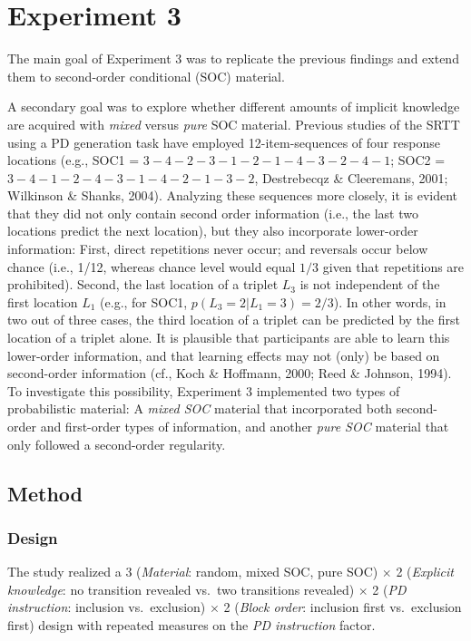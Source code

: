 \documentclass[floatsintext,doc]{apa6}
\theoremstyle{definition}
\theoremstyle{definition}
\theoremstyle{definition}
\theoremstyle{remark}
\begin{document}
\section{Experiment 3}\label{experiment-3}

The main goal of Experiment 3 was to replicate the previous findings and
extend them to second-order conditional (SOC) material.

A secondary goal was to explore whether different amounts of implicit
knowledge are acquired with \emph{mixed} versus \emph{pure} SOC
material. Previous studies of the SRTT using a PD generation task have
employed 12-item-sequences of four response locations (e.g., SOC1 =
\(3{-}4{-}2{-}3{-}1{-}2{-}1{-}4{-}3{-}2{-}4{-}1\); SOC2 =
\(3{-}4{-}1{-}2{-}4{-}3{-}1{-}4{-}2{-}1{-}3{-}2\), Destrebecqz \&
Cleeremans, 2001; Wilkinson \& Shanks, 2004). Analyzing these sequences
more closely, it is evident that they did not only contain second order
information (i.e., the last two locations predict the next location),
but they also incorporate lower-order information: First, direct
repetitions never occur; and reversals occur below chance (i.e., 1/12,
whereas chance level would equal \(1/3\) given that repetitions are
prohibited). Second, the last location of a triplet \(L_3\) is not
independent of the first location \(L_1\) (e.g., for SOC1,
\(p(L_3 = 2 | L_1 = 3) = 2/3\)). In other words, in two out of three
cases, the third location of a triplet can be predicted by the first
location of a triplet alone. It is plausible that participants are able
to learn this lower-order information, and that learning effects may not
(only) be based on second-order information (cf., Koch \& Hoffmann,
2000; Reed \& Johnson, 1994). To investigate this possibility,
Experiment 3 implemented two types of probabilistic material: A
\emph{mixed SOC} material that incorporated both second-order and
first-order types of information, and another \emph{pure SOC} material
that only followed a second-order regularity.

\subsection{Method}\label{method-2}

\subsubsection{Design}\label{design-2}

The study realized a 3 (\emph{Material}: random, mixed SOC, pure SOC)
\(\times\) 2 (\emph{Explicit knowledge}: no transition revealed vs.~two
transitions revealed) \(\times\) 2 (\emph{PD instruction}: inclusion
vs.~exclusion) \(\times\) 2 (\emph{Block order}: inclusion first
vs.~exclusion first) design with repeated measures on the \emph{PD
instruction} factor.
\end{document}
